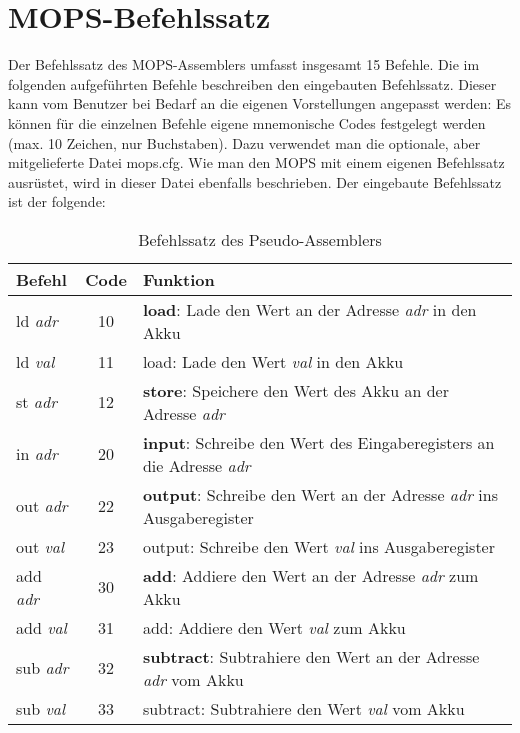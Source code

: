 \documentclass[loesung]{schulein}
\begin{document}
\section*{MOPS-Befehlssatz}
Der Befehlssatz des MOPS-Assemblers umfasst insgesamt 15 Befehle. Die im folgenden aufgeführten Befehle beschreiben den eingebauten Befehlssatz. Dieser kann vom Benutzer bei Bedarf an die eigenen Vorstellungen angepasst werden: Es können für die einzelnen Befehle eigene mnemonische Codes festgelegt werden (max. 10 Zeichen, nur Buchstaben). Dazu verwendet man die optionale, aber mitgelieferte Datei mops.cfg. Wie man den MOPS mit einem eigenen Befehlssatz ausrüstet, wird in dieser Datei ebenfalls beschrieben. Der eingebaute Befehlssatz ist der folgende: 
%
\begin{table}[H]
\caption{Befehlssatz des Pseudo-Assemblers}
\renewcommand{\arraystretch}{1.5}
\begin{tabularx}{\textwidth}{|l|c|X|}
\hline 
\rule[-1ex]{0pt}{2.5ex} \textbf{Befehl} & \textbf{Code} & \textbf{Funktion} \\ 
\hline 
\rule[-1ex]{0pt}{2.5ex} ld \textit{adr} & 10 & \textbf{load}: Lade den Wert an der Adresse \textit{adr} in den Akku \\ 
\hline 
\rule[-1ex]{0pt}{2.5ex} ld \textit{val} & 11 & load: Lade den Wert \textit{val} in den Akku\\ 
\hline 
\rule[-1ex]{0pt}{2.5ex} st \textit{adr} & 12 & \textbf{store}: Speichere den Wert des Akku an der Adresse \textit{adr} \\ 
\hline 
\rule[-1ex]{0pt}{2.5ex} in \textit{adr} & 20 & \textbf{input}: Schreibe den Wert des Eingaberegisters an die Adresse \textit{adr} \\ 
\hline 
\rule[-1ex]{0pt}{2.5ex} out \textit{adr} & 22 & \textbf{output}: Schreibe den Wert an der Adresse \textit{adr} ins Ausgaberegister \\ 
\hline 
\rule[-1ex]{0pt}{2.5ex} out \textit{val} & 23 & output: Schreibe den Wert \textit{val} ins Ausgaberegister \\ 
\hline
\rule[-1ex]{0pt}{2.5ex} add \textit{adr} & 30 & \textbf{add}: Addiere den Wert an der Adresse \textit{adr} zum Akku \\ 
\hline 
\rule[-1ex]{0pt}{2.5ex} add \textit{val} & 31 & add: Addiere den Wert \textit{val} zum Akku \\ 
\hline 
\rule[-1ex]{0pt}{2.5ex} sub \textit{adr} & 32 & \textbf{subtract}: Subtrahiere den Wert an der Adresse \textit{adr} vom Akku \\ 
\hline 
\rule[-1ex]{0pt}{2.5ex} sub \textit{val} & 33 & subtract: Subtrahiere den Wert \textit{val} vom Akku \\ 

\end{tabularx}
\end{table}
\end{document}
